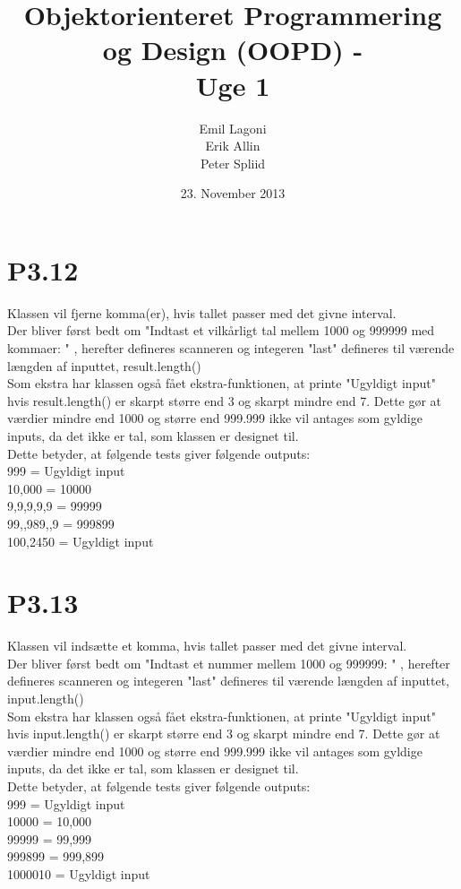 \documentclass[a4paper,12pt]{article}
\title{Objektorienteret Programmering og Design (OOPD) - \\ Uge 1}
\author{Emil Lagoni \\ Erik Allin \\ Peter Spliid}
\date{23. November 2013}
\begin{document}
\maketitle %
\thispagestyle{empty}
\setcounter{page}{0}
\newpage



\section*{P3.12}
Klassen vil fjerne komma(er), hvis tallet passer med det givne interval.\\
Der bliver først bedt om "Indtast et vilkårligt tal mellem 1000 og 999999 med kommaer: " , herefter defineres scanneren og integeren "last" defineres til værende længden af inputtet, result.length() \\
Som ekstra har klassen også fået ekstra-funktionen, at printe "Ugyldigt input" hvis result.length() er skarpt større end 3 og skarpt mindre end 7. Dette gør at værdier mindre end 1000 og større end 999.999 ikke vil antages som gyldige inputs, da det ikke er tal, som klassen er designet til. \\
Dette betyder, at følgende tests giver følgende outputs: \\[5px]
999 = Ugyldigt input \\
10,000 = 10000 \\
9,9,9,9,9 = 99999 \\
99,,989,,9 = 999899 \\
100,2450 = Ugyldigt input

\section*{P3.13}
Klassen vil indsætte et komma, hvis tallet passer med det givne interval.\\
Der bliver først bedt om "Indtast et nummer mellem 1000 og 999999: " , herefter defineres scanneren og integeren "last" defineres til værende længden af inputtet, input.length() \\
Som ekstra har klassen også fået ekstra-funktionen, at printe "Ugyldigt input" hvis input.length() er skarpt større end 3 og skarpt mindre end 7. Dette gør at værdier mindre end 1000 og større end 999.999 ikke vil antages som gyldige inputs, da det ikke er tal, som klassen er designet til. \\
Dette betyder, at følgende tests giver følgende outputs: \\[5px]
999 = Ugyldigt input \\
10000 = 10,000 \\
99999 = 99,999 \\
999899 = 999,899 \\
1000010 = Ugyldigt input
\end{document}

